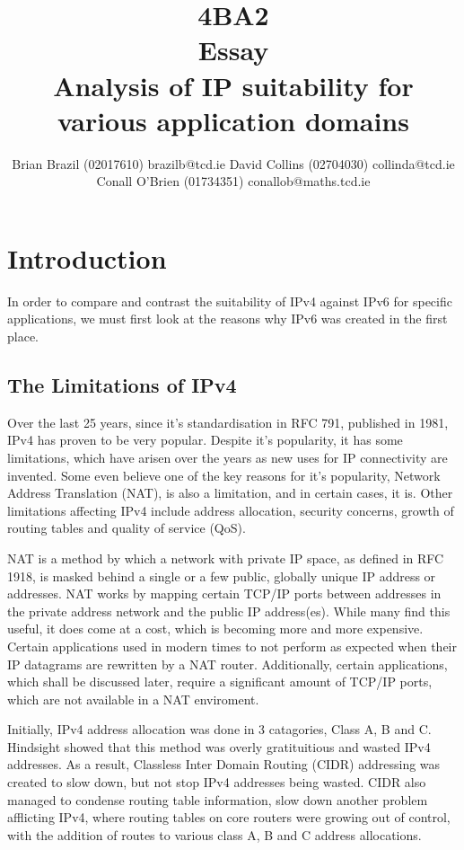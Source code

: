 \documentclass[a4paper,12pt]{article}
\begin{document}
\title{4BA2 \\ Essay \\ Analysis of IP suitability for various application domains}

\author{Brian Brazil (02017610) brazilb@tcd.ie
David Collins (02704030) collinda@tcd.ie \\ 
Conall O'Brien (01734351) conallob@maths.tcd.ie}

\maketitle

\section{Introduction}

In order to compare and contrast the suitability of IPv4 against IPv6
for specific applications, we must first look at the reasons why IPv6
was created in the first place.

\subsection{The Limitations of IPv4}

Over the last 25 years, since it's standardisation in RFC 791, published
in 1981, IPv4 has proven to be very popular. Despite it's popularity, it 
has some limitations, which have arisen over the years as new uses for 
IP connectivity are invented. Some even believe one of the key reasons
for it's popularity, Network Address Translation (NAT), is also a 
limitation, and in certain cases, it is. Other limitations
affecting IPv4 include address allocation, security concerns, growth of 
routing tables and quality of service (QoS).


NAT is a method by which a network with private IP space, as defined in
RFC 1918, is masked behind a single or a few public, globally unique IP
address or addresses. NAT works by mapping certain TCP/IP ports between
addresses in the private address network and the public IP address(es).
While many find this useful, it does come at a cost, which is becoming
more and more expensive. Certain applications used in modern times to
not perform as expected when their IP datagrams are rewritten by a NAT
router. Additionally, certain applications, which shall be discussed
later, require a significant amount of TCP/IP ports, which are not
available in a NAT enviroment.


Initially, IPv4 address allocation was done in 3 catagories, Class A, B
and C. Hindsight showed that this method was overly gratituitious and
wasted IPv4 addresses. As a result, Classless Inter Domain Routing
(CIDR) addressing was created to slow down, but not stop IPv4 addresses
being wasted. CIDR also managed to condense routing table information,
slow down another problem afflicting IPv4, where routing tables on core
routers were growing out of control, with the addition of routes to
various class A, B and C address allocations.
\end{document}
